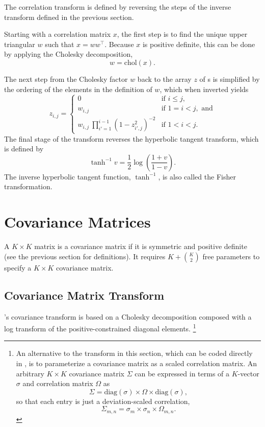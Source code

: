The correlation transform is defined by reversing the steps of the
inverse transform defined in the previous section.  

Starting with a correlation matrix $x$, the first step is to find the
unique upper triangular $w$ such that $x = w w^{\top}$.  Because $x$
is positive definite, this can be done by applying the Cholesky
decomposition,
\[
w = \mbox{chol}(x).
\]


The next step from the Cholesky factor $w$ back to the array $z$ of
{\CPC}s is simplified by the ordering of the elements in the
definition of $w$, which when inverted yields
%
\[
z_{i,j} =
\left\{
\begin{array}{cl}
0 & \mbox{if } i \leq j,
\\[8pt]
w_{i,j} & \mbox{if } 1 = i < j, \mbox{ and}
\\[8pt]
{w_{i,j}}
\
\prod_{i'=1}^{i-1} \left( 1 - z_{i'\!,j}^2 \right)^{-2}
& \mbox{if } 1 < i < j.
\end{array}
\right.
\]
The final stage of the transform reverses the hyperbolic tangent
transform, which is defined by 
\[
\tanh^{-1} v = \frac{1}{2} \log \left( \frac{1 + v}{1 - v} \right).
\]
The inverse hyperbolic tangent function, $\tanh^{-1}$, is also called
the Fisher transformation.


\section{Covariance Matrices}

A $K \times K$ matrix is a covariance matrix if it is symmetric and
positive definite (see the previous section for definitions).  It
requires $K + \binom{K}{2}$ free parameters to specify a $K \times K$
covariance matrix.


\subsection{Covariance Matrix Transform}

\Stan's covariance transform is based on a Cholesky decomposition
composed with a log transform of the positive-constrained diagonal
elements.%
%
\footnote{An alternative to the transform in this section, which can
  be coded directly in \Stan, is to parameterize a covariance matrix
  as a scaled correlation matrix.  An arbitrary $K \times K$
  covariance matrix $\Sigma$ can be expressed in terms of a $K$-vector
  $\sigma$ and correlation matrix $\Omega$ as
  \[
  \Sigma = \mbox{diag}(\sigma) \times \Omega \times \mbox{diag}(\sigma),
  \]
  so that each entry is just a deviation-scaled correlation,
  \[
  \Sigma_{m,n} = \sigma_m \times \sigma_n \times \Omega_{m,n}.
  \]
}


